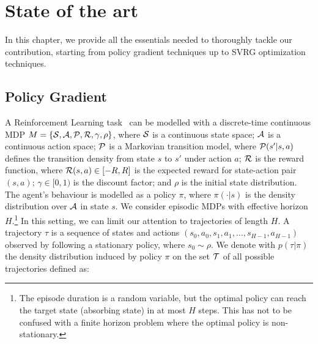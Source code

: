 \chapter{State of the art}\label{chap:art}

\vspace{-0.05in}
In this chapter, we provide all the essentials needed to thoroughly tackle our contribution, starting from policy gradient techniques up to \acs{SVRG} optimization techniques.
\vspace{-0.05in}

\section{Policy Gradient}\label{sec:PolicyGradient}
\vspace{-0.05in}
A Reinforcement Learning task~\citep{sutton1998reinforcement} can be modelled with a discrete-time continuous \acs{MDP} $M = \{\mathcal{S},\mathcal{A},\mathcal{P},\mathcal{R},\gamma,\rho\}$, where $\mathcal{S}$ is a continuous state space; $\mathcal{A}$ is a continuous action space; $\mathcal{P}$ is a Markovian transition model, where $\mathcal{P}(s'|s,a)$ defines the transition density from state $s$ to $s'$ under action $a$; $\mathcal{R}$ is the reward function, where $\mathcal{R}(s,a) \in [-R,R]$ is the expected reward for state-action pair $(s,a)$;
$\gamma\in[0,1)$ is the discount factor; and $\rho$ is the initial state distribution.
The agent's behaviour is modelled as a policy $\pi$, where $\pi(\cdot|s)$ is the density distribution over $\mathcal{A}$ in state $s$.
We consider episodic \acs{MDP}s with effective horizon $H$.\footnote{The episode duration is a random variable, but the optimal policy can reach the target state (\ie absorbing state) in at most $H$ steps. This has not to be confused with a finite horizon problem where the optimal policy is non-stationary.} In this setting, we can limit our attention to trajectories of length $H$. A trajectory $\tau$ is a sequence of states and actions $(s_0,a_0,s_1,a_1,\dots,s_{H-1},a_{H-1})$ observed by following a stationary policy, where $s_0 \sim \rho$.
We denote with $p(\tau|\pi)$ the density distribution induced by policy $\pi$ on the set $\mathcal{T}$ of all possible trajectories defined as:

